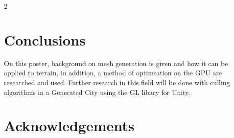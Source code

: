 \documentclass[a0,portrait]{a0poster}
\begin{document}
\begin{multicols}{2}

\section*{Conclusions}
On this poster, background on mesh generation is given and how it can be applied to terrain, in addition, a method of optimsation on the GPU are researched and used. Further research in this field will be done with culling algorithms in a Generated City using the GL libary for Unity.


\nocite{*} %


\section*{Acknowledgements}


\end{multicols}
\end{document}

